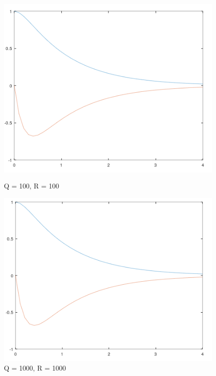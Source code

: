 \documentclass{jsarticle}
\begin{document}
\begin{figure}[h!]
  \centering
  \begin{minipage}{0.325\linewidth}
    \centering
    \includegraphics[width=\linewidth]{./fig/q100_r100.png}
    \caption{Q = 100, R = 100}
  \end{minipage}
  \hfill
  \begin{minipage}{0.325\linewidth}
    \centering
    \includegraphics[width=\linewidth]{./fig/q1000_r1000.png}
    \caption{Q = 1000, R = 1000}
  \end{minipage}
  \hfill
  \begin{minipage}{0.325\linewidth}

\end{minipage}
\end{figure}
\end{document}
